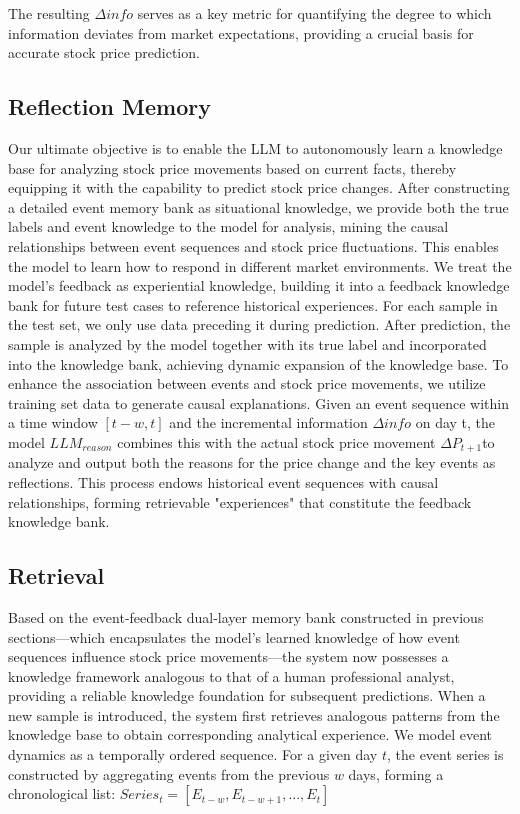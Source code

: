 \documentclass[sigconf, nonacm]{acmart} %
\begin{document}
The resulting $\Delta info$ serves as a key metric for quantifying the degree to which information deviates from market expectations, providing a crucial basis for accurate stock price prediction.

\subsection{Reflection Memory}
Our ultimate objective is to enable the LLM to autonomously learn a knowledge base for analyzing stock price movements based on current facts, thereby equipping it with the capability to predict stock price changes.
After constructing a detailed event memory bank as situational knowledge, we provide both the true labels and event knowledge to the model for analysis, mining the causal relationships between event sequences and stock price fluctuations. This enables the model to learn how to respond in different market environments. We treat the model's feedback as experiential knowledge, building it into a feedback knowledge bank for future test cases to reference historical experiences.
For each sample in the test set, we only use data preceding it during prediction. After prediction, the sample is analyzed by the model together with its true label and incorporated into the knowledge bank, achieving dynamic expansion of the knowledge base.
To enhance the association between events and stock price movements, we utilize training set data to generate causal explanations. Given an event sequence 
within a time window $[t-w,t]$ and the incremental information $\Delta info$ on day t, the model $LLM_{reason}$ combines this with the actual stock price movement $\Delta P_{t+1} $to analyze and output both the reasons for the price change and the key events as reflections.
This process endows historical event sequences with causal relationships, forming retrievable "experiences" that constitute the feedback knowledge bank.

\subsection{Retrieval}
Based on the event-feedback dual-layer memory bank constructed in previous sections—which encapsulates the model's learned knowledge of how event sequences influence stock price movements—the system now possesses a knowledge framework analogous to that of a human professional analyst, providing a reliable knowledge foundation for subsequent predictions. When a new sample is introduced, the system first retrieves analogous patterns from the knowledge base to obtain corresponding analytical experience.
We model event dynamics as a temporally ordered sequence. For a given day $t$, the event series is constructed by aggregating events from the previous $w$ days, forming a chronological list: $
Series_t = [E_{t-w}, E_{t-w+1}, ..., E_t]$
\end{document}
